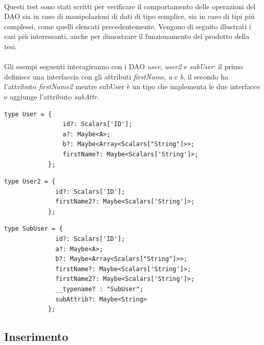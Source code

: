 \documentclass[a4paper, 12pt]{report}
\begin{document}
        \paragraph*{}
          Questi test sono stati scritti per verificare il comportamento delle operazioni del DAO sia in caso di manipolazioni di dati di tipo semplice, sia in caso di tipi più complessi, come quelli elencati precedentemente.
          Vengono di seguito illustrati i casi più interessanti, anche per dimostrare il funzionamento del prodotto della tesi.
          \paragraph*{}
          Gli esempi seguenti interagiranno con i DAO \emph{user}, \emph{user2} e \emph{subUser}: il primo definisce una interfaccia con gli attributi \emph{firstName}, \emph{a} e \emph{b}, il secondo ha l'attributo \emph{firstName2} mentre subUser è un tipo che implementa le due interfacce e aggiunge l'attributo \emph{subAttr}.
          \begin{Verbatim}[samepage=true]
            type User = {
                id?: Scalars['ID'];
                a?: Maybe<A>;
                b?: Maybe<Array<Scalars["String"]>>;
                firstName?: Maybe<Scalars['String']>;
            };
          \end{Verbatim}
          \begin{Verbatim}[samepage=true]
            type User2 = {
              id?: Scalars['ID'];
              firstName2?: Maybe<Scalars['String']>;
            };
          \end{Verbatim}
          \begin{Verbatim}[samepage=true]
            type SubUser = {
              id?: Scalars['ID'];
              a?: Maybe<A>;
              b?: Maybe<Array<Scalars["String"]>>;
              firstName?: Maybe<Scalars['String']>;
              firstName2?: Maybe<Scalars['String']>;
              __typename? : "SubUser";
              subAttrib?: Maybe<String>
            };

          \end{Verbatim}
        \subsection{Inserimento}
\end{document}
